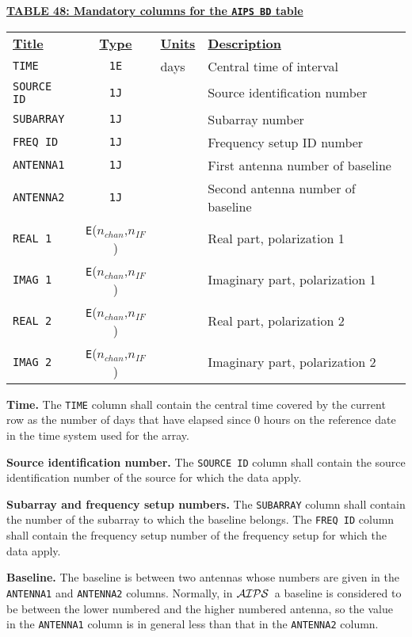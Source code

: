 \documentclass[twoside]{article}
\newcommand{\AIPS}{{$\cal AIPS\/$}}
\newcommand{\nif}{$n_{IF}$}
\newcommand{\nchan}{$n_{chan}$}
\begin{document}
\begin{center}
\underline{\bf{TABLE 48: Mandatory columns for the {\tt AIPS BD} table}}\\
\begin{tabular}{lcll}
\noalign{\vspace{2pt}} \label{ta:BDcols}
\underline{{\bf Title\vphantom{y}}} & \underline{\bf{Type}} &
   \underline{{\bf Units\vphantom{y}}} & \underline{\bf{Description}} \\
\noalign{\vspace{2pt}}
{\tt TIME}      & {\tt 1E} & days & Central time of interval \\
{\tt SOURCE ID} & {\tt 1J} &      & Source identification number \\
{\tt SUBARRAY}  & {\tt 1J} &      & Subarray number \\
{\tt FREQ ID}   & {\tt 1J} &      & Frequency setup ID number \\
{\tt ANTENNA1}  & {\tt 1J} &      & First antenna number of baseline \\
{\tt ANTENNA2}  & {\tt 1J} &      & Second antenna number of baseline \\
{\tt REAL 1}    & {\tt E}(\nchan,\nif) & & Real part, polarization 1 \\
{\tt IMAG 1}    & {\tt E}(\nchan,\nif) & & Imaginary part, polarization 1 \\
\hline
{\tt REAL 2}    & {\tt E}(\nchan,\nif) & & Real part, polarization 2 \\
{\tt IMAG 2}    & {\tt E}(\nchan,\nif) & & Imaginary part, polarization 2
\end{tabular}
\end{center}

{\bf Time.}  The {\tt TIME} column shall contain the central time
covered by the current row as the number of days that have elapsed
since 0 hours on the reference date in the time system used for the
array.

{\bf Source identification number.}  The {\tt SOURCE ID} column shall
contain the source identification number of the source for which the
data apply.

{\bf Subarray  and frequency setup numbers.} The {\tt SUBARRAY} column
shall contain the number of the subarray to which the baseline belongs.
The {\tt FREQ ID} column shall contain the frequency setup number of
the frequency setup for which the data apply.

{\bf Baseline.} The baseline is between two antennas whose numbers are
given in the {\tt ANTENNA1} and {\tt ANTENNA2} columns.  Normally, in
\AIPS\ a baseline is considered to be between the lower numbered and
the higher numbered antenna, so the value in the {\tt ANTENNA1} column
is in general less than that in the {\tt ANTENNA2} column.
\end{document}
